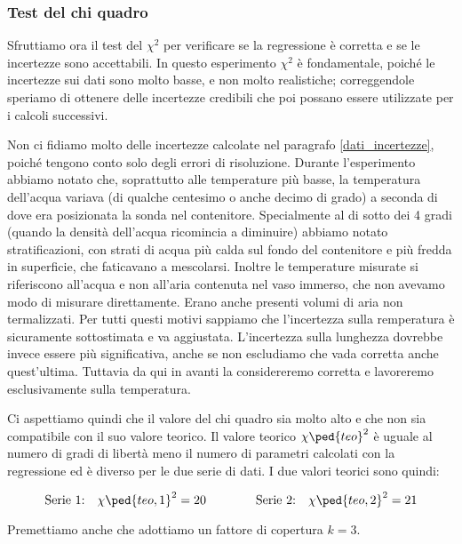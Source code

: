 \subsubsection{Test del chi quadro}

Sfruttiamo ora il test del $\chi^2$ per verificare se la regressione è corretta e se le incertezze sono accettabili.
In questo esperimento $\chi^2$ è fondamentale, poiché le incertezze sui dati sono molto basse, e non molto realistiche;
correggendole speriamo di ottenere delle incertezze credibili che poi possano essere utilizzate per i calcoli successivi.

Non ci fidiamo molto delle incertezze calcolate nel paragrafo \ref{dati_incertezze}, poiché tengono conto solo degli errori
di risoluzione. Durante l'esperimento abbiamo notato che, soprattutto alle temperature più basse, la temperatura dell'acqua
variava (di qualche centesimo o anche decimo di grado) a seconda di dove era posizionata la sonda nel contenitore. Specialmente
al di sotto dei 4 gradi (quando la densità dell'acqua ricomincia a diminuire) abbiamo notato stratificazioni, con strati di acqua
più calda sul fondo del contenitore e più fredda in superficie, che faticavano a mescolarsi. Inoltre le temperature misurate
si riferiscono all'acqua e non all'aria contenuta nel vaso immerso, che non avevamo modo di misurare direttamente. Erano anche
presenti volumi di aria non termalizzati. Per tutti questi motivi sappiamo che l'incertezza sulla remperatura è sicuramente
sottostimata e va aggiustata. L'incertezza sulla lunghezza dovrebbe invece essere più significativa, anche se non escludiamo
che vada corretta anche quest'ultima. Tuttavia da qui in avanti la considereremo corretta e lavoreremo esclusivamente sulla temperatura.

Ci aspettiamo quindi che il valore del chi quadro sia molto alto e che non sia compatibile con il suo valore teorico. Il valore teorico
$\chi\ped{teo}^2$ è uguale al numero di gradi di libertà meno il numero di parametri calcolati con la regressione ed è diverso per 
le due serie di dati. I due valori teorici sono quindi:

\begin{equation}
    \text{Serie 1:} \quad \chi\ped{teo,1}^2 = 20 \qquad \qquad \text{Serie 2:} \quad \chi\ped{teo,2}^2 = 21
\end{equation}

Premettiamo anche che adottiamo un fattore di copertura $k = 3$.

